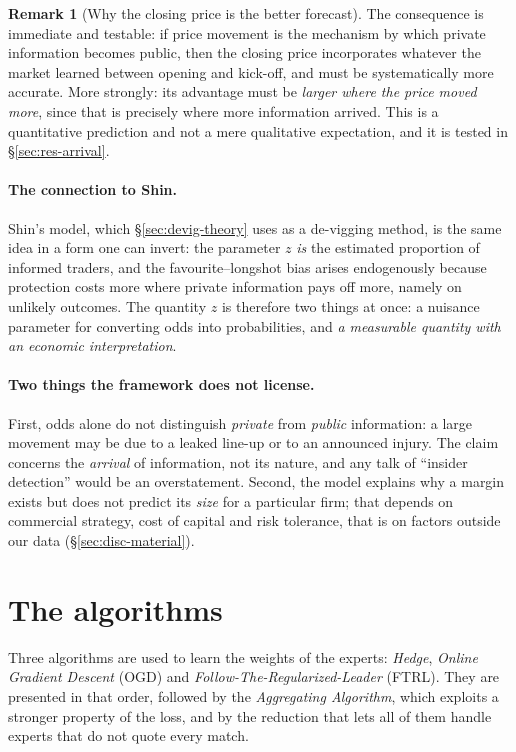 \documentclass[12pt,a4paper,oneside]{report}
\renewcommand{\_}{\oldunderscore\allowbreak}
\theoremstyle{definition}
\theoremstyle{plain}
\theoremstyle{definition}   %
\newtheorem{remark}[theorem]{Remark}
\begin{document}
\begin{remark}[Why the closing price is the better forecast]
\label{rem:closing}
The consequence is immediate and testable: if price movement is the mechanism by which private
information becomes public, then the closing price incorporates whatever the market learned
between opening and kick-off, and must be systematically more accurate. More strongly: its
advantage must be \emph{larger where the price moved more}, since that is precisely where more
information arrived. This is a quantitative prediction and not a mere qualitative expectation,
and it is tested in \S\ref{sec:res-arrival}.
\end{remark}

\paragraph{The connection to Shin.} Shin's model, which \S\ref{sec:devig-theory} uses as a
de-vigging method, is the same idea in a form one can invert: the parameter $z$ \emph{is} the
estimated proportion of informed traders, and the favourite--longshot bias arises endogenously
because protection costs more where private information pays off more, namely on unlikely
outcomes. The quantity $z$ is therefore two things at once: a nuisance parameter for converting
odds into probabilities, and \emph{a measurable quantity with an economic interpretation}.

\paragraph{Two things the framework does not license.} First, odds alone do not distinguish
\emph{private} from \emph{public} information: a large movement may be due to a leaked line-up
or to an announced injury. The claim concerns the \emph{arrival} of information, not its
nature, and any talk of ``insider detection'' would be an overstatement. Second, the model
explains why a margin exists but does not predict its \emph{size} for a particular firm; that
depends on commercial strategy, cost of capital and risk tolerance, that is on factors outside
our data (\S\ref{sec:disc-material}).

\section{The algorithms}

Three algorithms are used to learn the weights of the experts: \emph{Hedge},
\emph{Online Gradient Descent} (OGD) and \emph{Follow-The-Regularized-Leader} (FTRL). They are
presented in that order, followed by the \emph{Aggregating Algorithm}, which exploits a stronger
property of the loss, and by the reduction that lets all of them handle experts that do not quote
every match.
\end{document}
